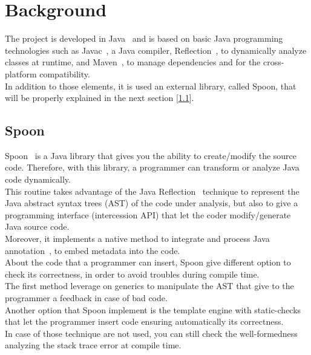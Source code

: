\chapter{Background}\label{ch:background}
The project is developed in Java~\cite{Arnold:2000:JPL:556709} and is based on basic Java programming technologies such as Javac~\cite{javacWiki}, a Java compiler, Reflection~\cite{reflect}, to dynamically analyze classes at runtime, and Maven~\cite{bharathan2015apache}, to manage dependencies and for the cross-platform compatibility.\\
In addition to those elements, it is used an external library, called Spoon, that will be properly explained in the next section [\ref{sec:spoon}].

\section{Spoon}\label{sec:spoon}
Spoon~\cite{pawlak:hal-01169705} is a Java library that gives you the ability to create/modify the source code.
Therefore, with this library, a programmer can transform or analyze Java code dynamically.\\
This routine takes advantage of the Java Reflection~\cite{reflect} technique to represent the Java abstract syntax trees (AST) of the code under analysis, but also to give a programming interface (intercession API) that let the coder modify/generate Java source code.\\
Moreover, it implements a native method to integrate and process Java annotation~\cite{annotation}, to embed metadata into the code.\\
About the code that a programmer can insert, Spoon give different option to check its correctness, in order to avoid troubles during compile time.\\
The first method leverage on generics to manipulate the AST that give to the programmer a feedback in case of bad code.\\
Another option that Spoon implement is the template engine with static-checks that let the programmer insert code ensuring automatically its correctness.\\
In case of those technique are not used, you can still check the well-formedness  analyzing the stack trace error at compile time.


